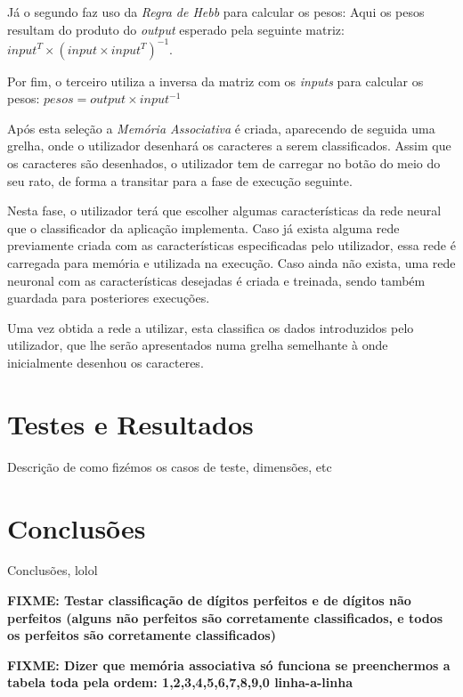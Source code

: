 \documentclass{article}
\begin{document}
Já o segundo faz uso da \emph{Regra de Hebb} para calcular os pesos: Aqui os pesos resultam do produto do \emph{output} esperado pela seguinte matriz: $input^{T}\times \left(input\times input^{T}\right)^{-1}$.

Por fim, o terceiro utiliza a inversa da matriz com os \emph{inputs} para calcular os pesos: $pesos = output\times input^{-1}$

Após esta seleção a \emph{Memória Associativa} é criada, aparecendo de seguida uma grelha, onde o utilizador desenhará os caracteres a serem classificados. Assim que os caracteres são desenhados, o utilizador tem de carregar no botão do meio do seu rato, de forma a transitar para a fase de execução seguinte.

Nesta fase, o utilizador terá que escolher algumas características da rede neural que o classificador da aplicação implementa. Caso já exista alguma rede previamente criada com as características especificadas pelo utilizador, essa rede é carregada para memória e utilizada na execução. Caso ainda não exista, uma rede neuronal com as características desejadas é criada e treinada, sendo também guardada para posteriores execuções. 

Uma vez obtida a rede a utilizar, esta classifica os dados introduzidos pelo utilizador, que lhe serão apresentados numa grelha semelhante à onde inicialmente desenhou os caracteres.


\pagebreak

\section{Testes e Resultados}

Descrição de como fizémos os casos de teste, dimensões, etc

\pagebreak

\section{Conclusões}

Conclusões, lolol

\pagebreak

\textbf{FIXME: Testar classificação de dígitos perfeitos e de dígitos não perfeitos (alguns não perfeitos são corretamente classificados, e todos os perfeitos são corretamente classificados)}

\textbf{FIXME: Dizer que memória associativa só funciona se preenchermos a tabela toda pela ordem: 1,2,3,4,5,6,7,8,9,0 linha-a-linha}
\end{document}
